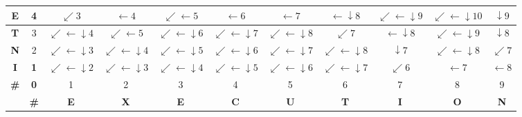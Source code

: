 \documentclass[10pt,a4paper]{article}
\begin{document}
\begin{center}
\begin{tabular}{|c|c|c|c|c|c|c|c|c|c|c|}
\textbf{E} & 4 & $\swarrow 3$ & $\leftarrow 4$ & \cellcolor{pathcolor}\textbf{${\swarrow}{\leftarrow} 5$} & \cellcolor{pathcolor}\textbf{$\leftarrow 6$} & $\leftarrow 7$ & ${\leftarrow}{\downarrow} 8$ & ${\swarrow}{\leftarrow}{\downarrow} 9$ & ${\swarrow}{\leftarrow}{\downarrow} 10$ & $\downarrow 9$ \\ \hline
\textbf{T} & 3 & ${\swarrow}{\leftarrow}{\downarrow} 4$ & \cellcolor{pathcolor}\textbf{${\swarrow}{\leftarrow} 5$} & ${\swarrow}{\leftarrow}{\downarrow} 6$ & ${\swarrow}{\leftarrow}{\downarrow} 7$ & ${\swarrow}{\leftarrow}{\downarrow} 8$ & $\swarrow 7$ & ${\leftarrow}{\downarrow} 8$ & ${\swarrow}{\leftarrow}{\downarrow} 9$ & $\downarrow 8$ \\ \hline
\textbf{N} & 2 & \cellcolor{pathcolor}\textbf{${\swarrow}{\leftarrow}{\downarrow} 3$} & ${\swarrow}{\leftarrow}{\downarrow} 4$ & ${\swarrow}{\leftarrow}{\downarrow} 5$ & ${\swarrow}{\leftarrow}{\downarrow} 6$ & ${\swarrow}{\leftarrow}{\downarrow} 7$ & ${\swarrow}{\leftarrow}{\downarrow} 8$ & $\downarrow 7$ & ${\swarrow}{\leftarrow}{\downarrow} 8$ & $\swarrow 7$ \\ \hline
\textbf{I} & \cellcolor{pathcolor}\textbf{1} & ${\swarrow}{\leftarrow}{\downarrow} 2$ & ${\swarrow}{\leftarrow}{\downarrow} 3$ & ${\swarrow}{\leftarrow}{\downarrow} 4$ & ${\swarrow}{\leftarrow}{\downarrow} 5$ & ${\swarrow}{\leftarrow}{\downarrow} 6$ & ${\swarrow}{\leftarrow}{\downarrow} 7$ & $\swarrow 6$ & $\leftarrow 7$ & $\leftarrow 8$ \\ \hline
\textbf{\#} & \cellcolor{pathcolor}\textbf{0} & 1 & 2 & 3 & 4 & 5 & 6 & 7 & 8 & 9 \\ \hline
 & \textbf{\#} & \textbf{E} & \textbf{X} & \textbf{E} & \textbf{C} & \textbf{U} & \textbf{T} & \textbf{I} & \textbf{O} & \textbf{N} \\ \hline
\end{tabular}
\end{center}
\vspace{-4pt}
\end{document}
